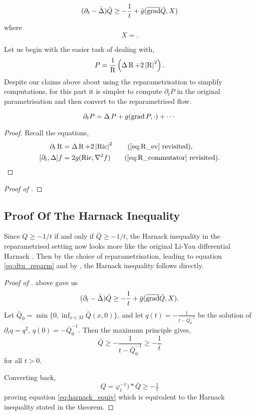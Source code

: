 \documentclass{amsart}
\begin{document}
\begin{prop}
\label{prop:Q_maxprinciple}
\[
(\partial_t - \bar{\Delta}) \bar{Q} \geq - \frac{1}{t} + \bar{g}(\overline{\operatorname{grad}} \bar{Q}, X)
\]
where
\[
X = .
\]
\end{prop}

Let us begin with the easier task of dealing with,
\[
P = \frac{1}{\operatorname{R}} \left(\operatorname{\Delta} \operatorname{R} + 2\left|{\operatorname{R}}\right|^2\right).
\]
Despite our claims above about using the reparametrisation to simplify computations, for this part it is simpler to compute \(\partial_t P\) in the original parametrisation and then convert to the reparametrised flow.

\begin{lemma}
\label{lem:dtP}
\[
\partial_t P = \operatorname{\Delta} P + g(\operatorname{grad} P, \cdot) + \cdots
\]
\end{lemma}

\begin{proof}
Recall the equations,
\begin{align*}
\partial_t \R &= \laplace \R + 2 \abs{\ric}^2 \tag{\ref{eq:R_ev} revisited}, \\
[\partial_t, \laplace] f &= 2 g(\ric, \nabla^2 f) \tag{\ref{eq:R_commutator} revisited}.
\end{align*}
\end{proof}

\begin{proof}[Proof of ]

\end{proof}

\subsection{Proof Of The Harnack Inequality}
\label{subsec:harnack_proof}

Since \(Q \geq -1/t\) if and only if \(\bar{Q} \geq -1/t\), the Harnack inequality in the reparametrised setting now looks more like the original Li-Yau differential Harnack \cite{LiYau:/1986}. Then by the choice of reparametrisation, leading to equation \eqref{eq:dtu_reparm} and by , the Harnack inequality follows directly.

\begin{proof}[Proof of ]
 above gave us
\[
(\partial_t - \bar{\Delta}) \bar{Q} \geq - \frac{1}{t} + \bar{g}(\overline{\operatorname{grad}} \bar{Q}, X).
\]
Let \(\bar{Q}_0 = \min\{0, \inf_{x\in M} \bar{Q}(x, 0)\}\), and let \(q(t) = -\tfrac{1}{t - \bar{Q}_0^{-1}}\) be the solution of \(\partial_t q = q^2\), \(q(0) = -\bar{Q}_0^{-1}\). Then the maximum principle gives,
\[
\bar{Q} \geq -\frac{1}{t - \bar{Q}_0^{-1}} \geq -\frac{1}{t}
\]
for all \(t > 0\).

Converting back,
\[
Q = \varphi_t^{-1}){\ast} \bar{Q} \geq -\tfrac{1}{t}
\]
proving equation \eqref{eq:harnack_equiv} which is equivalent to the Harnack inequality stated in the theorem.
\end{proof}
\end{document}
